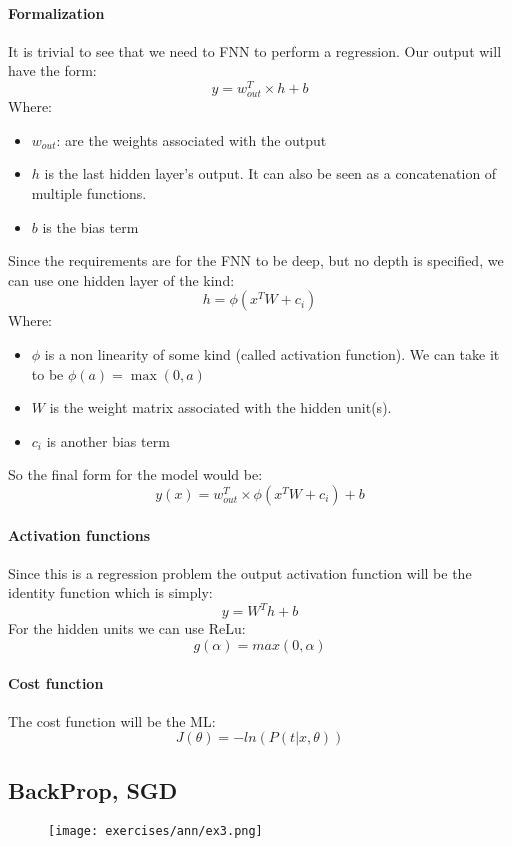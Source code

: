 \paragraph{Formalization}
It is trivial to see that we need to FNN to perform a regression.
Our output will have the form:
$$y=w_{out}^T\times h+b$$
Where:
\begin{itemize}
\item $w_{out}$: are the weights associated with the output
\item $h$ is the last hidden layer's output. It can also be seen as a concatenation of multiple functions.
\item $b$ is the bias term
\end{itemize}
Since the requirements are for the FNN to be deep, but no depth is specified, we can use one hidden layer of the kind:
$$h=\phi(x^TW+c_i)$$
Where:
\begin{itemize}
\item $\phi$ is a non linearity of some kind (called activation function). We can take it to be $\phi(a)=\max(0,a)$
\item $W$ is the weight matrix associated with the hidden unit(s).
\item $c_i$ is another bias term 
\end{itemize}

So the final form for the model would be:
$$y(x)=w_{out}^T\times \phi(x^TW+c_i)+b$$

\paragraph{Activation functions}
Since this is a regression problem the output activation function will be the identity function which is simply:
$$y=W^Th+b$$
For the hidden units we can use ReLu:
$$g(\alpha)=max(0,\alpha)$$

\paragraph{Cost function }
The cost function will be the ML:
$$J(\theta)=-ln(P(t|x,\theta))$$

\subsection{BackProp, SGD}

\begin{figure}[H]
    \centering
    \texttt{[image: exercises/ann/ex3.png]}
\end{figure}

